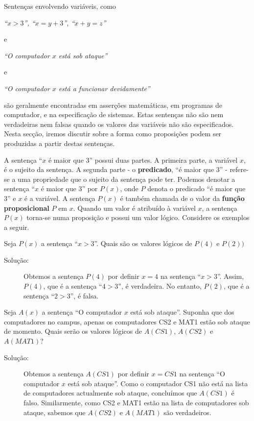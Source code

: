 Sentenças envolvendo variáveis, como

\begin{center}\emph{``$x > 3$'', ``$x = y + 3$'', ``$x + y = z$''}\end{center}

e

\begin{center}\emph{``O computador $x$ está sob ataque''}\end{center}

e

\begin{center}\emph{``O computador $x$ está a funcionar devidamente''}\end{center}

são geralmente encontradas em asserções matemáticas, em programas de computador,
e na especificação de sistemas. Estas sentenças não são nem verdadeiras nem
falsas quando os valores das variáveis não são especificados. Nesta secção,
iremos discutir sobre a forma como proposições podem ser produzidas a partir
destas sentenças.

A sentença ``$x$ é maior que 3'' possui duas partes. A primeira parte, a
variável $x$, é o sujeito da sentença. A segunda parte - o \textbf{predicado},
``é maior que 3'' - refere-se a uma propriedade que o sujeito da sentença pode
ter. Podemos denotar a sentença ``$x$ é maior que 3'' por $P(x)$, onde $P$
denota o predicado ``é maior que 3'' e $x$ é a variável. A sentença $P(x)$ é
também chamada de o valor da \textbf{função proposicional} $P$ em $x$. Quando um
valor é atribuído à variável $x$, a sentença $P(x)$ torna-se numa proposição e
possui um valor lógico. Considere os exemplos a seguir.
 
\begin{exmp}
\label{exem128}
Seja $P(x)$ a sentença ``$x>3$''. Quais são os valores lógicos de $P(4)$ e
$P(2))$
\end{exmp}
\begin{description}
\item[Solução:] Obtemos a sentença $P(4)$ por definir $x=4$ na sentença
``$x>3$''. Assim, $P(4)$, que é a sentença ``$4 > 3$'', é verdadeira. No
entanto, $P(2)$, que é a sentença ``$2>3$'', é falsa.	
\end{description}

\begin{exmp}
\label{exem129}
Seja $A(x)$ a sentença ``O computador $x$ está sob ataque''. Suponha que dos
computadores no campus, apenas os computadores CS2 e MAT1 estão sob ataque de
momento. Quais serão os valores lógicos de $A(CS1)$, $A(CS2)$ e $A(MAT1)$?
\end{exmp}
\begin{description}
\item[Solução:] Obtemos a sentença $A(CS1)$ por definir $x = CS1$ na
sentença ``O computador $x$ está sob ataque''. Como o computador CS1 não
está na lista de computadores actualmente sob ataque, concluímos que
$A(CS1)$ é falso. Similarmente, como CS2 e MAT1 estão na lista de
computadores sob ataque, sabemos que $A(CS2)$ e $A(MAT1)$ são
verdadeiros.
\end{description}

